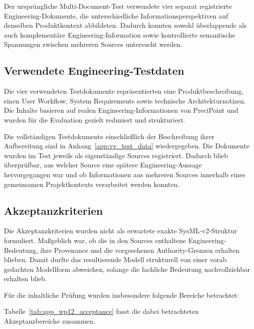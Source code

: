 Der ursprüngliche Multi-Document-Test verwendete vier separat registrierte
Engineering-Dokumente, die unterschiedliche Informationsperspektiven auf
denselben Produktkontext abbildeten. Dadurch konnten sowohl überlappende als
auch komplementäre Engineering-Information sowie kontrollierte semantische
Spannungen zwischen mehreren Sources untersucht werden.

\subsection{Verwendete Engineering-Testdaten}

Die vier verwendeten Testdokumente repräsentierten eine
Produktbeschreibung, einen User Workflow, System Requirements sowie
technische Architekturnotizen. Die Inhalte basieren auf realen
Engineering-Informationen von PreciPoint und wurden für die Evaluation
gezielt reduziert und strukturiert.

Die vollständigen Testdokumente einschließlich der Beschreibung ihrer
Aufbereitung sind in Anhang~\ref{app:vv_test_data} wiedergegeben. Die
Dokumente wurden im Test jeweils als eigenständige Sources registriert.
Dadurch blieb überprüfbar, aus welcher Source eine spätere Engineering-Aussage
hervorgegangen war und ob Informationen aus mehreren Sources innerhalb eines
gemeinsamen Projektkontexts verarbeitet werden konnten.

\subsection{Akzeptanzkriterien}

Die Akzeptanzkriterien wurden nicht als erwartete exakte SysML-v2-Struktur
formuliert. Maßgeblich war, ob die in den Sources enthaltene
Engineering-Bedeutung, ihre Provenance und die vorgesehenen
Authority-Grenzen erhalten blieben. Damit durfte das resultierende Modell
strukturell von einer vorab gedachten Modellform abweichen, solange die
fachliche Bedeutung nachvollziehbar erhalten blieb.

Für die inhaltliche Prüfung wurden insbesondere folgende Bereiche betrachtet:

Tabelle~\ref{tab:app_wp12_acceptance} fasst die dabei betrachteten
Akzeptanzbereiche zusammen.

